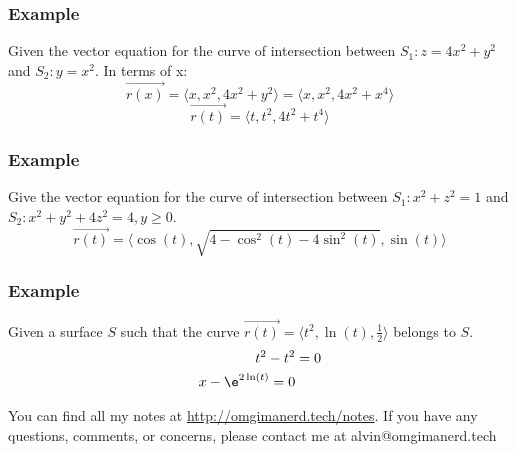 \documentclass[letterpaper, 12pt]{math}
\begin{document}
\subsubsection*{Example}
Given the vector equation for the curve of intersection between
\( S_1: z = 4x^2+y^2 \) and \( S_2: y = x^2 \). In terms of x:
\[ \vec{r(x)} = \langle x,x^2,4x^2+y^2\rangle = \langle x,x^2,4x^2+x^4\rangle \]
\[ \vec{r(t)} = \langle t,t^2,4t^2+t^4\rangle \]

\subsubsection*{Example}
Give the vector equation for the curve of intersection between
\( S_1: x^2+z^2 = 1 \) and \( S_2: x^2+y^2+4z^2 = 4, y\ge0 \).
\[ \vec{r(t)} = \langle\cos(t),\sqrt{4-\cos^2(t)-4\sin^2(t)},\sin(t)\rangle \]

\subsubsection*{Example}
Given a surface \( S \) such that the curve \( \vec{r(t)} = \langle t^2,\ln(t),
\frac{1}{2}\rangle \) belongs to \( S \).
\begin{align*}
  t^2-t^2 &= 0 \\
  x-\e^{2\ln(t)} = 0
\end{align*}

\begin{center}
  You can find all my notes at \url{http://omgimanerd.tech/notes}. If you have
  any questions, comments, or concerns, please contact me at
  alvin@omgimanerd.tech
\end{center}
\end{document}
